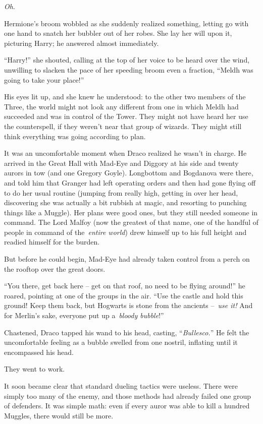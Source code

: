 \emph{Oh}.

Hermione's broom wobbled as she suddenly realized something, letting go
with one hand to snatch her bubbler out of her robes. She lay her will
upon it, picturing Harry; he answered almost immediately.

``Harry!'' she shouted, calling at the top of her voice to be heard over
the wind, unwilling to slacken the pace of her speeding broom even a
fraction, ``Meldh was going to take your place!''

His eyes lit up, and she knew he understood: to the other two members of
the Three, the world might not look any different from one in which
Meldh had succeeded and was in control of the Tower. They might not have
heard her use the counterspell, if they weren't near that group of
wizards. They might still think everything was going according to plan.

\mybreak

It was an uncomfortable moment when Draco realized he wasn't in charge.
He arrived in the Great Hall with Mad-Eye and Diggory at his side and
twenty aurors in tow (and one Gregory Goyle). Longbottom and Bogdanova
were there, and told him that Granger had left operating orders and then
had gone flying off to do her usual routine (jumping from really high,
getting in over her head, discovering she was actually a bit rubbish at
magic, and resorting to punching things like a Muggle). Her plans were
good ones, but they still needed someone in command. The Lord Malfoy
(now the greatest of that name, one of the handful of people in command
of the~\emph{entire world}) drew himself up to his full height and
readied himself for the burden.

But before he could begin, Mad-Eye had already taken control from a
perch on the rooftop over the great doors.

``You there, get back here -- get on that roof, no need to be flying
around!'' he roared, pointing at one of the groups in the air. ``Use the
castle and hold this ground! Keep them back, but Hogwarts is stone from
the ancients --~\emph{use it!} And for Merlin's sake, everyone put up
a~\emph{bloody bubble}!''

Chastened, Draco tapped his wand to his head, casting,
``\emph{Bullesco.}'' He felt the uncomfortable feeling as a bubble
swelled from one nostril, inflating until it encompassed his head.

They went to work.

It soon became clear that standard dueling tactics were useless. There
were simply too many of the enemy, and those methods had already failed
one group of defenders. It was simple math: even if every auror was able
to kill a hundred Muggles, there would still be more.

